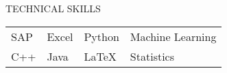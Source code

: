 \documentclass{resume} %
\begin{document}
\begin{rSection}{TECHNICAL SKILLS}
\begin{center}
\begin{tabular}{ l l l l }
SAP & Excel & Python & Machine Learning \\ C++ & Java & LaTeX & Statistics \\
\end{tabular}
\end{center}
\end{rSection}
\end{document}
